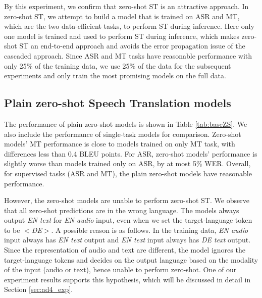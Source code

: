 \documentclass[conference]{IEEEtran}
\begin{document}
	By this experiment, we confirm that zero-shot ST is an attractive approach. In zero-shot ST, we attempt to build a model that is trained on ASR and MT, which are the two data-efficient tasks, to perform ST during inference. Here only one model is trained and used to perform ST during inference, which makes zero-shot ST an end-to-end approach and avoids the error propagation issue of the cascaded approach. Since ASR and MT tasks have reasonable performance with only 25\% of the training data, we use 25\% of the data for the subsequent experiments and only train the most promising models on the full data.
	
	\subsection{Plain zero-shot Speech Translation models} \label{sec:baseZS}
	The performance of plain zero-shot models is shown in Table \ref{tab:baseZS}. We also include the performance of single-task models for comparison. Zero-shot models' MT performance is close to models trained on only MT task, with differences less than 0.4 BLEU  points. For ASR, zero-shot models' performance is slightly worse than models trained only on ASR, by at most 5\% WER. Overall, for supervised tasks (ASR and MT), the plain zero-shot models have reasonable performance.
	
	However, the zero-shot models are unable to perform zero-shot ST. We observe that all zero-shot predictions are in the wrong language. The models always output \textit{EN text} for \textit{EN audio} input, even when we set the target-language token to be \textit{$<$DE$>$}. A possible reason is as follows. In the training data, \textit{EN audio} input always has \textit{EN text} output and \textit{EN text} input always has \textit{DE text} output. Since the representation of audio and text are different, the model ignores the target-language tokens and decides on the output language based on the modality of the input (audio or text), hence unable to perform zero-shot. One of our experiment results supports this hypothesis, which will be discussed in detail in Section \ref{sec:ad4_exp}.
	
\end{document}
